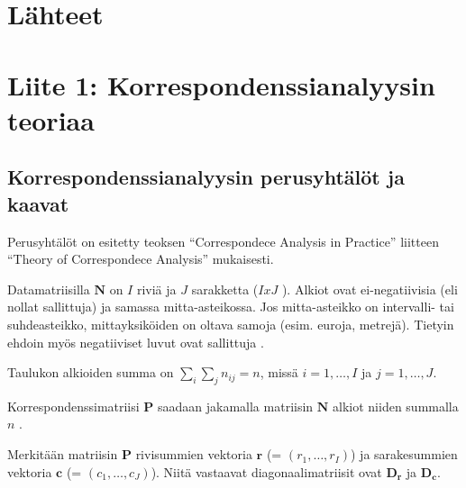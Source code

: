 \documentclass[
  finnish,
]{book}
\begin{document}
\hypertarget{luxe4hteet}{%
\chapter*{Lähteet}\label{luxe4hteet}}

\hypertarget{refs}{}

\hypertarget{appendix-liitteet}{%
\appendix}


\hypertarget{liite-1-korrespondenssianalyysin-teoriaa}{%
\chapter*{Liite 1: Korrespondenssianalyysin teoriaa}\label{liite-1-korrespondenssianalyysin-teoriaa}}

\hypertarget{korrespondenssianalyysin-perusyhtuxe4luxf6t-ja-kaavat}{%
\section*{Korrespondenssianalyysin perusyhtälöt ja kaavat}\label{korrespondenssianalyysin-perusyhtuxe4luxf6t-ja-kaavat}}

Perusyhtälöt on esitetty teoksen ``Correspondece Analysis in Practice''\citep{RefWorks:doc:5a857a43e4b0ed2d44664d78}
liitteen ``Theory of Correspondece Analysis'' mukaisesti.

Datamatriisilla \(\boldsymbol{N}\) on \(I\) riviä ja \(J\) sarakketta (\(I x J\) ).
Alkiot ovat ei-negatiivisia (eli nollat sallittuja) ja samassa mitta-asteikossa.
Jos mitta-asteikko on intervalli- tai suhdeasteikko, mittayksiköiden on oltava
samoja (esim. euroja, metrejä). Tietyin ehdoin myös negatiiviset luvut ovat
sallittuja \citep[ s. 60]{RefWorks:doc:5a857a43e4b0ed2d44664d75}.

Taulukon alkioiden summa on
\(\sum_{i} \sum_{j}n_{ij} = n\), missä \(i = 1, \dots , I\) ja \(j = 1, \dots , J\).

Korrespondenssimatriisi \(\boldsymbol{P}\) saadaan jakamalla matriisin
\(\boldsymbol{N}\) alkiot niiden summalla \(n\) .

Merkitään matriisin \(\boldsymbol{P}\) rivisummien vektoria
\(\boldsymbol{r}\) (= \((r_{1}, \dots, r_{I})\)) ja sarakesummien vektoria
\(\boldsymbol{c}\) (= \((c_{1}, \dots, c_{J})\)).
Niitä vastaavat diagonaalimatriisit ovat \(\boldsymbol{D_r}\) ja
\(\boldsymbol{D_c}\).
\end{document}
